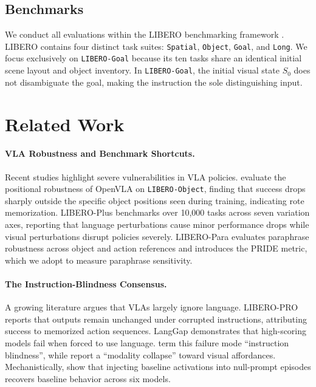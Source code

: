 \documentclass[11pt]{article}
\begin{document}
\subsection{Benchmarks}
We conduct all evaluations within the LIBERO benchmarking framework \citep{liu2023libero}. LIBERO contains four distinct task suites: \texttt{Spatial}, \texttt{Object}, \texttt{Goal}, and \texttt{Long}. We focus exclusively on \texttt{LIBERO-Goal} because its ten tasks share an identical initial scene layout and object inventory. In \texttt{LIBERO-Goal}, the initial visual state $S_0$ does not disambiguate the goal, making the instruction the sole distinguishing input.

\section{Related Work}

\paragraph{VLA Robustness and Benchmark Shortcuts.} Recent studies highlight severe vulnerabilities in VLA policies. \citet{pang2025openvla} evaluate the positional robustness of OpenVLA on \texttt{LIBERO-Object}, finding that success drops sharply outside the specific object positions seen during training, indicating rote memorization. LIBERO-Plus \citep{fei2025liberoplus} benchmarks over 10,000 tasks across seven variation axes, reporting that language perturbations cause minor performance drops while visual perturbations disrupt policies severely. LIBERO-Para \citep{kim2026liberopara} evaluates paraphrase robustness across object and action references and introduces the PRIDE metric, which we adopt to measure paraphrase sensitivity.

\paragraph{The Instruction-Blindness Consensus.} A growing literature argues that VLAs largely ignore language. LIBERO-PRO \citep{zhou2025liberopro} reports that outputs remain unchanged under corrupted instructions, attributing success to memorized action sequences. LangGap \citep{hou2026langgap} demonstrates that high-scoring models fail when forced to use language. \citet{zhang2026flatness} term this failure mode ``instruction blindness'', while \citet{zhan2026stable} report a ``modality collapse'' toward visual affordances. Mechanistically, \citet{grant2026features} show that injecting baseline activations into null-prompt episodes recovers baseline behavior across six models.
\end{document}
